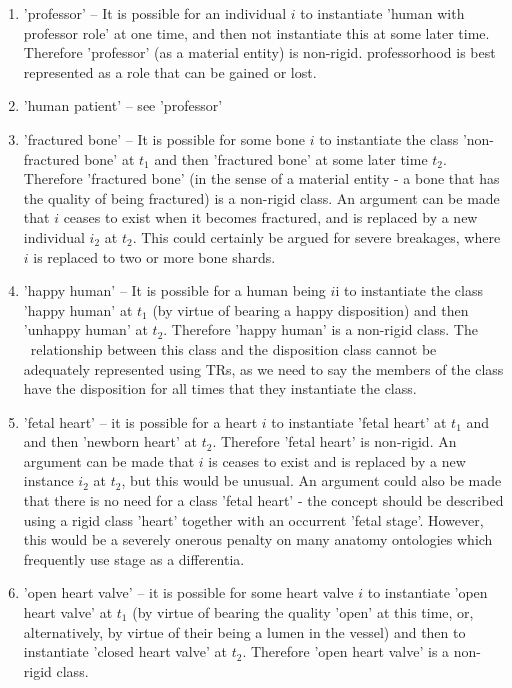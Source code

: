 \documentclass{bioinfo}
\begin{document}
\begin{enumerate}
\item 'professor' -- It is possible for an individual $i$ to
  instantiate 'human with professor role' at one time, and then not
  instantiate this at some later time. Therefore 'professor' (as a
  material entity) is non-rigid. professorhood is best represented as
  a role that can be gained or lost.

  \item 'human patient' -- see 'professor'

  \item 'fractured bone' -- It is possible for some bone $i$ to
    instantiate the class 'non-fractured bone' at $t_1$ and then
    'fractured bone' at some later time $t_2$. Therefore 'fractured
    bone' (in the sense of a material entity - a bone that has the
    quality of being fractured) is a non-rigid class. An argument can
    be made that $i$ ceases to exist when it becomes fractured, and is
    replaced by a new individual $i_2$ at $t_2$. This could certainly
    be argued for severe breakages, where $i$ is replaced to two or
    more bone shards.

  \item 'happy human' -- It is possible for a human being $i$i to
    instantiate the class 'happy human' at $t_1$ (by virtue of bearing
    a happy disposition) and then 'unhappy human' at $t_2$. Therefore
    'happy human' is a non-rigid class. The \
    relationship between this class and the disposition class cannot
    be adequately represented using TRs, as we need to say the members
    of the class have the disposition for all times that they
    instantiate the class.

  \item 'fetal heart' -- it is possible for a heart $i$ to instantiate
    'fetal heart' at $t_1$ and and then 'newborn heart' at
    $t_2$. Therefore 'fetal heart' is non-rigid. An argument can be
    made that $i$ is ceases to exist and is replaced by a new instance
    $i_2$ at $t_2$, but this would be unusual. An argument could also
    be made that there is no need for a class 'fetal heart' - the
    concept should be described using a rigid class 'heart' together
    with an occurrent 'fetal stage'. However, this would be a severely
    onerous penalty on many anatomy ontologies which frequently use
    stage as a differentia.

  \item 'open heart valve' -- it is possible for some heart valve $i$
    to instantiate 'open heart valve' at $t_1$ (by virtue of bearing
    the quality 'open' at this time, or, alternatively, by virtue of
    their being a lumen in the vessel) and then to instantiate 'closed
    heart valve' at $t_2$. Therefore 'open heart valve' is a non-rigid
    class.


\end{enumerate}
\end{document}
